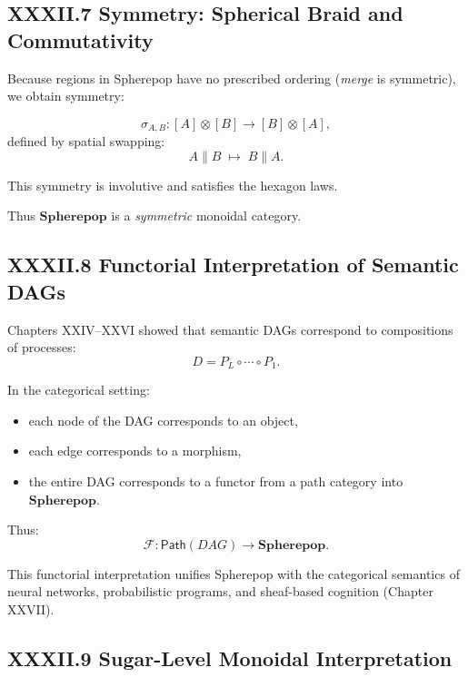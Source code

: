 \documentclass[11pt,letterpaper]{article}
\begin{document}
\subsection{XXXII.7 Symmetry: Spherical Braid and Commutativity}

Because regions in Spherepop have no prescribed ordering (\emph{merge} is symmetric), we obtain symmetry:

\[
\sigma_{A,B} : [A] \otimes [B] \to [B] \otimes [A],
\]
defined by spatial swapping:
\[
A \parallel B \;\mapsto\; B \parallel A.
\]

This symmetry is involutive and satisfies the hexagon laws.

Thus $\mathbf{Spherepop}$ is a \emph{symmetric} monoidal category.

\subsection{XXXII.8 Functorial Interpretation of Semantic DAGs}

Chapters XXIV--XXVI showed that semantic DAGs correspond to compositions of processes:
\[
D = P_L \circ \cdots \circ P_1.
\]

In the categorical setting:

\begin{itemize}
    \item each node of the DAG corresponds to an object,
    \item each edge corresponds to a morphism,
    \item the entire DAG corresponds to a functor from a path category into $\mathbf{Spherepop}$.
\end{itemize}

Thus:
\[
\mathcal{F} : \mathsf{Path}(DAG) \to \mathbf{Spherepop}.
\]

This functorial interpretation unifies Spherepop with the categorical semantics of neural networks, probabilistic programs, and sheaf-based cognition (Chapter XXVII).

\subsection{XXXII.9 Sugar-Level Monoidal Interpretation}
\end{document}
